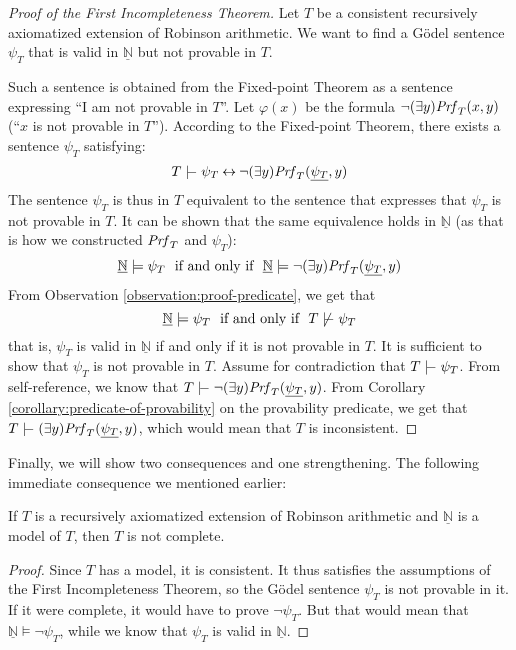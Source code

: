     \begin{proof}[Proof of the First Incompleteness Theorem]
    Let $T$ be a consistent recursively axiomatized extension of Robinson arithmetic. We want to find a Gödel sentence $\psi_T$ that is valid in $\underline{\mathbb N}$ but not provable in $T$.
    
    Such a sentence is obtained from the Fixed-point Theorem as a sentence expressing ``I am not provable in $T$''. Let $\varphi(x)$ be the formula $\neg(\exists y)\mathit{Prf}_T(x,y)$ (``$x$ is not provable in $T$''). According to the Fixed-point Theorem, there exists a sentence $\psi_T$ satisfying:
    $$
    T\proves\psi_T\liff\neg(\exists y)\Prf_T(\underline{\psi_T},y)
    $$
    The sentence $\psi_T$ is thus in $T$ equivalent to the sentence that expresses that $\psi_T$ is not provable in $T$. It can be shown that the same equivalence holds in $\underline{\mathbb N}$ (as that is how we constructed $\mathit{Prf}_T$ and $\psi_T$):
    $$
    \underline{\mathbb N}\models\psi_T\ \text{ if and only if }\ \underline{\mathbb N}\models\neg(\exists y)\mathit{Prf}_T(\underline{\psi_T},y)
    $$
    From Observation \ref{observation:proof-predicate}, we get that 
    $$
    \underline{\mathbb N}\models\psi_T\ \text{ if and only if }\ T\not\proves\psi_T
    $$
    that is, $\psi_T$ is valid in $\underline{\mathbb N}$ if and only if it is not provable in $T$. It is sufficient to show that $\psi_T$ is not provable in $T$. Assume for contradiction that $T\proves\psi_T$. From self-reference, we know that 
    $T\proves\neg(\exists y)\Prf_T(\underline{\psi_T},y)$.
    From Corollary \ref{corollary:predicate-of-provability} on the provability predicate, we get that $T\proves (\exists y)\Prf_T(\underline{\psi_T},y)$, which would mean that $T$ is inconsistent.
    \end{proof}
    
    Finally, we will show two consequences and one strengthening. The following immediate consequence we mentioned earlier:
    
    \begin{corollary}
    If $T$ is a recursively axiomatized extension of Robinson arithmetic and $\underline{\mathbb N}$ is a model of $T$, then $T$ is not complete.
    \end{corollary}
    \begin{proof}
    Since $T$ has a model, it is consistent. It thus satisfies the assumptions of the First Incompleteness Theorem, so the Gödel sentence $\psi_T$ is not provable in it. If it were complete, it would have to prove $\neg\psi_T$. But that would mean that $\underline{\mathbb N}\models\neg\psi_T$, while we know that $\psi_T$ is valid in $\underline{\mathbb N}$.  
    \end{proof}
    
